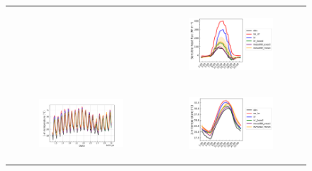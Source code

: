 \begin{figure}[hbtp]
\begin{tabular}{cc}
\begin{subfigure}[t]{0.5\textwidth}
        \end{subfigure} &
        \begin{subfigure}[t]{0.5\textwidth}
            \caption{}
            \includegraphics[width=\textwidth]{images/chap5/SOP_TS_DC/diurnal_cycle_cendrosa_sens.png}
        \end{subfigure} \\
        \begin{subfigure}[t]{0.5\textwidth}
            \caption{}
            \includegraphics[width=\textwidth]{images/chap5/SOP_TS_DC/time_series_cendrosa_t2m.png}
        \end{subfigure} &
        \begin{subfigure}[t]{0.5\textwidth}
            \caption{}
            \includegraphics[width=\textwidth]{images/chap5/SOP_TS_DC/diurnal_cycle_cendrosa_t2m.png}

\end{subfigure}
\end{tabular}
\end{figure}
